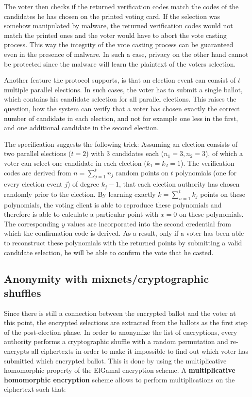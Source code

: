 The voter then checks if the returned verification codes match the codes of the candidates he has chosen on the printed voting card. If the selection was somehow manipulated by malware, the returned verification codes would not match the printed ones and the voter would have to abort the vote casting process. This way the integrity of the vote casting process can be guaranteed even in the presence of malware. In such a case, privacy on the other hand cannot be protected since the malware will learn the plaintext of the voters selection.

Another feature the protocol supports, is that an election event can consist of $t$ multiple parallel elections. In such cases, the voter has to submit a single ballot, which contains his candidate selection for all parallel elections. This raises the question, how the system can verify that a voter has chosen exactly the correct number of candidate in each election, and not for example one less in the first, and one additional candidate in the second election.

The specification suggests the following trick: Assuming an election consists of two parallel elections ($t=2$) with 3 candidates each ($n_1 = 3, n_2 = 3$), of which a voter can select one candidate in each election ($k_1 = k_2 =1$). The verification codes are derived from $n = \sum_{j=1}^{t} n_j$ random points on $t$ polynomials (one for every election event $j$) of degree $k_j - 1$, that each election authority has chosen randomly prior to the election. By learning exactly $k = \sum_{n=1}^{t} k_j$ points on these polynomials, the voting client is able to reproduce these polynomials and therefore is able to calculate a particular point with $x=0$ on these polynomials. The corresponding $y$ values are incorporated into the second credential from which the confirmation code is derived. As a result, only if a voter has been able to reconstruct these polynomials with the returned points by submitting a valid candidate selection, he will be able to confirm the vote that he casted.

\subsection{Anonymity with mixnets/cryptographic shuffles}

Since there is still a connection between the encrypted ballot and the voter at this point, the encrypted selections are extracted from the ballots as the first step of the post-election phase. In order to anonymize the list of encryptions, every authority performs a cryptographic shuffle with a random permutation and re-encrypts all ciphertexts in order to make it impossible to find out which voter has submitted which encrypted ballot. This is done by using the multiplicative homomorphic property of the ElGamal encryption scheme. A \textbf{multiplicative homomorphic encryption} scheme allows to perform multiplications on the ciphertext such that:

